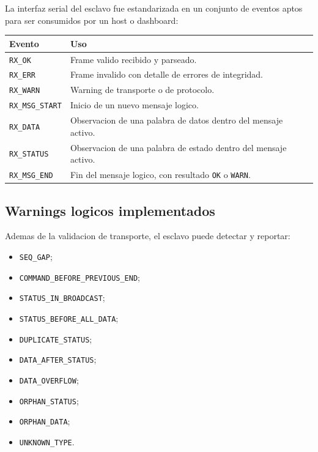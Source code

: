 \documentclass[12pt,a4paper]{article}
\begin{document}
La interfaz serial del esclavo fue estandarizada en un conjunto de eventos aptos para ser
consumidos por un host o dashboard:

\begin{longtable}{|>{\raggedright\arraybackslash}p{3.1cm}|>{\raggedright\arraybackslash}p{8.9cm}|}
\hline
\textbf{Evento} & \textbf{Uso} \\
\hline
\texttt{RX\_OK} & Frame valido recibido y parseado. \\
\hline
\texttt{RX\_ERR} & Frame invalido con detalle de errores de integridad. \\
\hline
\texttt{RX\_WARN} & Warning de transporte o de protocolo. \\
\hline
\texttt{RX\_MSG\_START} & Inicio de un nuevo mensaje logico. \\
\hline
\texttt{RX\_DATA} & Observacion de una palabra de datos dentro del mensaje activo. \\
\hline
\texttt{RX\_STATUS} & Observacion de una palabra de estado dentro del mensaje activo. \\
\hline
\texttt{RX\_MSG\_END} & Fin del mensaje logico, con resultado \texttt{OK} o \texttt{WARN}. \\
\hline
\end{longtable}

\subsection{Warnings logicos implementados}

Ademas de la validacion de transporte, el esclavo puede detectar y reportar:

\begin{itemize}
    \item \texttt{SEQ\_GAP};
    \item \texttt{COMMAND\_BEFORE\_PREVIOUS\_END};
    \item \texttt{STATUS\_IN\_BROADCAST};
    \item \texttt{STATUS\_BEFORE\_ALL\_DATA};
    \item \texttt{DUPLICATE\_STATUS};
    \item \texttt{DATA\_AFTER\_STATUS};
    \item \texttt{DATA\_OVERFLOW};
    \item \texttt{ORPHAN\_STATUS};
    \item \texttt{ORPHAN\_DATA};
    \item \texttt{UNKNOWN\_TYPE}.
\end{itemize}
\end{document}
